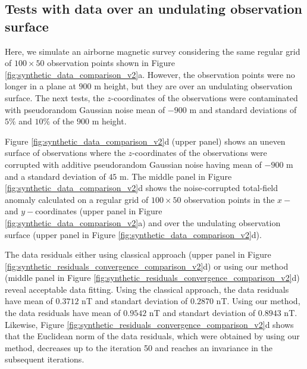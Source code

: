 \subsection*{Tests with data over an undulating observation surface}

Here, we simulate an airborne magnetic survey considering the same regular grid of $100 \times 50$ observation points shown in Figure  \ref{fig:synthetic_data_comparison_v2}a.
However, the observation points were no longer in a plane at $900$ m height, 
but they are over an undulating observation surface.
The next tests, the $z$-coordinates of the observations were contaminated with 
pseudorandom Gaussian noise mean of $- 900$ m and standard deviations of $5\%$ and $10\%$ of the $900$ m height.


Figure \ref{fig:synthetic_data_comparison_v2}d (upper panel) shows an uneven surface of observations where  the $z$-coordinates of the observations were corrupted with additive  pseudorandom Gaussian noise having mean of  $- 900$ m  and a standard deviation of $45$ m.
The middle panel in Figure \ref{fig:synthetic_data_comparison_v2}d shows the noise-corrupted total-field anomaly calculated on a regular grid  of $100 \times 50$ observation points in the $x-$ and $y-$coordinates 
(upper panel in Figure  \ref{fig:synthetic_data_comparison_v2}a) and
over the undulating observation surface (upper panel in Figure \ref{fig:synthetic_data_comparison_v2}d).
 
The data residuals either using classical approach 
(upper panel in Figure \ref{fig:synthetic_residuals_convergence_comparison_v2}d) or
using our method (middle panel in Figure \ref{fig:synthetic_residuals_convergence_comparison_v2}d) reveal acceptable data fitting.
Using the classical approach, the data residuals have mean of $0.3712$ nT 
and standart deviation of $0.2870$ nT.
Using our method, the data residuals have mean of $0.9542$ nT and standart deviation of $0.8943$ nT. 
Likewise,  Figure \ref{fig:synthetic_residuals_convergence_comparison_v2}d shows that the Euclidean norm of the data residuals, which were obtained by using our method, decreases up to the iteration 50  
and reaches an invariance in the subsequent iterations.  

